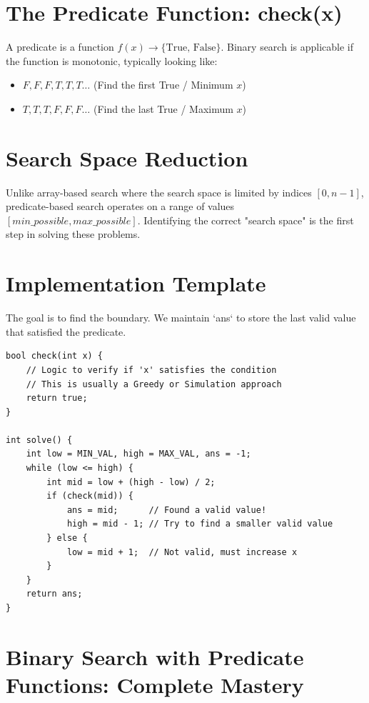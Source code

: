 \documentclass[11pt,a4paper,oneside]{book}
\begin{document}
\section{The Predicate Function: check(x)}
A predicate is a function $f(x) \to \{\text{True, False}\}$. Binary search is applicable if the function is monotonic, typically looking like:
\begin{itemize}
    \item $F, F, F, T, T, T \dots$ (Find the first True / Minimum $x$)
    \item $T, T, T, F, F, F \dots$ (Find the last True / Maximum $x$)
\end{itemize}

\section{Search Space Reduction}
Unlike array-based search where the search space is limited by indices $[0, n-1]$, predicate-based search operates on a range of values $[min\_possible, max\_possible]$. Identifying the correct "search space" is the first step in solving these problems.

\section{Implementation Template}
The goal is to find the boundary. We maintain `ans` to store the last valid value that satisfied the predicate.

\begin{tcolorbox}[enhanced, colback=darkgray!5!white, colframe=darkgray, title=Predicate Binary Search Template]
\begin{verbatim}
bool check(int x) {
    // Logic to verify if 'x' satisfies the condition
    // This is usually a Greedy or Simulation approach
    return true; 
}

int solve() {
    int low = MIN_VAL, high = MAX_VAL, ans = -1;
    while (low <= high) {
        int mid = low + (high - low) / 2;
        if (check(mid)) {
            ans = mid;      // Found a valid value!
            high = mid - 1; // Try to find a smaller valid value
        } else {
            low = mid + 1;  // Not valid, must increase x
        }
    }
    return ans;
}
\end{verbatim}
\end{tcolorbox}

\section{Binary Search with Predicate Functions: Complete Mastery}
\end{document}
